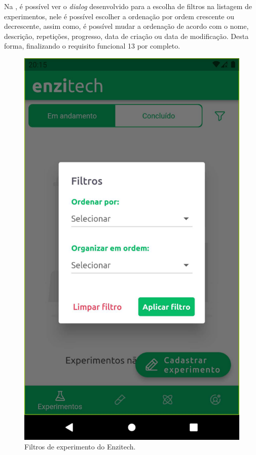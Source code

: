 Na , é possível ver o \textit{dialog} desenvolvido para a escolha de filtros na listagem de experimentos, nele é possível escolher a ordenação por ordem crescente ou decrescente, assim como, é possível mudar a ordenação de acordo com o nome, descrição, repetições, progresso, data de criação ou data de modificação. Desta forma, finalizando o requisito funcional 13 por completo.
 
 \begin{figure}[H]
\centering
  \includegraphics[width=\columnwidth/2]{images/filtros_sprint_6.pdf}
  \caption{Filtros de experimento do Enzitech.}
  \label{fig:filtros_sprint_6}
\end{figure}

